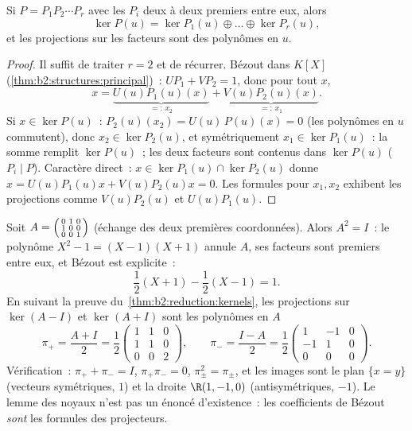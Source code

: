 \begin{theorem}\label{thm:b2:reduction:kernels}
Si $P = P_1 P_2 \cdots P_r$ avec les $P_i$ deux à deux premiers entre
eux, alors
\[
\ker P(u) = \ker P_1(u) \oplus \dots \oplus \ker P_r(u),
\]
et les projections sur les facteurs sont des polynômes en $u$.
\end{theorem}

\begin{proof}
Il suffit de traiter $r = 2$ et de récurrer. Bézout dans $K[X]$
(\cref{thm:b2:structures:principal})~: $U P_1 + V P_2 = 1$, donc pour
tout $x$,
\[
x = \underbrace{U(u)P_1(u)(x)}_{=:\,x_2}
+ \underbrace{V(u)P_2(u)(x)}_{=:\,x_1}.
\]
Si $x \in \ker P(u)$~: $P_2(u)(x_2) = U(u)\,P(u)(x) = 0$ (les
polynômes en $u$ commutent), donc $x_2 \in \ker P_2(u)$, et
symétriquement $x_1 \in \ker P_1(u)$~: la somme remplit $\ker P(u)$~;
les deux facteurs sont contenus dans $\ker P(u)$ ($P_i \mid P$).
Caractère direct~: $x \in \ker P_1(u) \cap \ker P_2(u)$ donne $x =
U(u)P_1(u)x + V(u)P_2(u)x = 0$. Les formules pour $x_1, x_2$ exhibent
les projections comme $V(u)P_2(u)$ et $U(u)P_1(u)$.
\end{proof}

\begin{example}\label{ex:b2:reduction:projectorswork}
Soit $A = \begin{psmallmatrix}0 & 1 & 0\\ 1 & 0 & 0\\ 0 & 0 &
1\end{psmallmatrix}$ (échange des deux premières coordonnées). Alors
$A^2 = I$~: le polynôme $X^2 - 1 = (X - 1)(X + 1)$ annule $A$, ses
facteurs sont premiers entre eux, et Bézout est explicite~:
\[
\frac{1}{2}(X + 1) - \frac12(X - 1) = 1 .
\]
En suivant la preuve du~\cref{thm:b2:reduction:kernels}, les
projections sur $\ker(A - I)$ et $\ker(A + I)$ sont les polynômes en
$A$
\[
\pi_+ = \frac{A + I}{2} = \frac12\begin{pmatrix}
1 & 1 & 0\\ 1 & 1 & 0\\ 0 & 0 & 2\end{pmatrix},
\qquad
\pi_- = \frac{I - A}{2} = \frac12\begin{pmatrix}
1 & -1 & 0\\ -1 & 1 & 0\\ 0 & 0 & 0\end{pmatrix}.
\]
Vérification~: $\pi_+ + \pi_- = I$, $\pi_+\pi_- = 0$, $\pi_\pm^2 =
\pi_\pm$, et les images sont le plan $\{x = y\}$ (vecteurs
symétriques,  $1$) et la droite $\R(1, -1, 0)$
(antisymétriques,  $-1$). Le lemme des noyaux n'est pas
un énoncé d'existence~: les coefficients de Bézout \emph{sont} les
formules des projecteurs.
\end{example}

